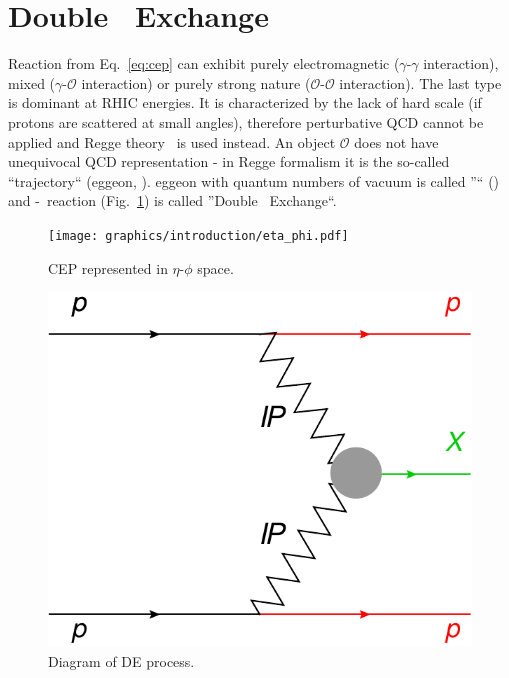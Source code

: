 \section{Double \Pomeron\  Exchange}\label{sec:DPE}
Reaction from Eq.~\eqref{eq:cep} can exhibit purely electromagnetic ($\gamma$-$\gamma$ interaction), mixed ($\gamma$-$\mathcal{O}$ interaction) or purely strong nature ($\mathcal{O}$-$\mathcal{O}$ interaction). The last type is dominant at RHIC energies. It is characterized by the lack of hard scale (if protons are scattered at small angles), therefore perturbative QCD cannot be applied and Regge theory~\cite{IntroductionToRegge} is used instead. An object $\mathcal{O}$ does not have unequivocal QCD representation - in Regge formalism it is the so-called ``trajectory`` (\Reg eggeon, \Reg). \Reg eggeon with quantum numbers of vacuum is called ''\Pomeron`` (\Pom) and \Pom-\Pom\ reaction (Fig.~\ref{fig:DPE}) is called ''Double \Pomeron\  Exchange``. %

\begin{figure}[b!]
\centering
\parbox{0.475\textwidth}{\vspace{-12pt}%
  \centering%
  \hspace*{-18pt}\texttt{[image: graphics/introduction/eta\_phi.pdf]}\vspace*{-15pt}%
  \caption{CEP represented in $\eta$-$\phi$ space.\\}%
  \label{fig:eta_phi}%
}
\quad\quad
\parbox{0.475\textwidth}{%
  \centering%
  \hspace*{5pt}\includegraphics[width=0.82\linewidth]{graphics/introduction/DPE.pdf}\vspace{6pt}%
  \caption{Diagram of D\Pom E process.\\}%
  \label{fig:DPE}%
}%
\end{figure}

